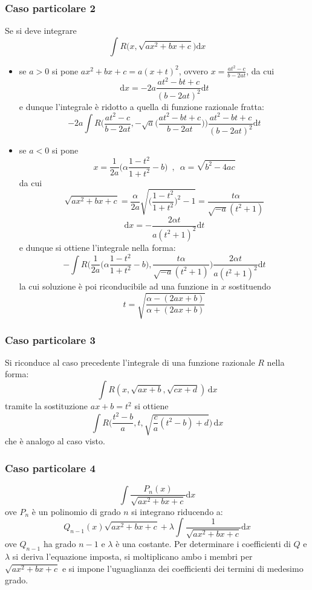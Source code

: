 \documentclass[10pt, oneside]{book}
\theoremstyle{plain}
\begin{document}
\subsubsection{Caso particolare 2}
Se si deve integrare
\[\int R\big(x, \sqrt{ax^2 +bx +c}\big)\textrm{d}x\]
\begin{itemize}
\item se $a > 0$ si pone $ax^2 + bx + c = a(x+t)^2$, ovvero $\displaystyle x = \frac{at^2 - c}{b - 2at}$, da cui
\[\textrm{d}x = - 2a \frac{at^2 - bt + c}{(b - 2at)^2	}\textrm{d}t\]
e dunque l'integrale è ridotto a quella di funzione razionale fratta:
\[-2a \int R \bigg(\frac{at^2 - c}{b - 2at}, - \sqrt{a}\big(\frac{at^2 - bt + c}{b-2at}\big)\bigg)\frac{at^2 - bt + c}{(b - 2at)^2	}\textrm{d}t\]
\item se $a < 0$ si pone
\[x = \frac{1}{2a} \big(\alpha \frac{1-t^2}{1+t^2} - b\big) \enspace, \enspace \alpha = \sqrt{b^2 - 4ac}\]
da cui
\[\sqrt{ax^2 + bx + c} = \frac{\alpha}{2a}\sqrt{\big(\frac{1-t^2}{1+t^2}\big)^2 - 1} = \frac{t\alpha}{\sqrt{-a}(t^2+1)}\]
\[\textrm{d}x = - \frac{2\alpha t}{a(t^2 + 1)^2}\textrm{d}t\]
e dunque si ottiene l'integrale nella forma:
\[- \int R \bigg(\frac{1}{2a} \big(\alpha \frac{1-t^2}{1+t^2} - b\big), \frac{t\alpha}{\sqrt{-a}(t^2+1)}\bigg)\frac{2\alpha t}{a(t^2+1)^2}\textrm{d}t\]
la cui soluzione è poi riconducibile ad una funzione in $x$ sostituendo
\[t = \sqrt{\frac{\alpha - (2ax + b)}{\alpha + (2ax + b)}}\]
\end{itemize}

\subsubsection{Caso particolare 3}
Si riconduce al caso precedente l'integrale di una funzione razionale $R$ nella forma:
\[\int R(x, \sqrt{ax+b}, \sqrt{cx + d}) \, \textrm{d}x\]
tramite la sostituzione $ax + b = t^2$ si ottiene
\[\int R \bigg(\frac{t^2 - b}{a}, t, \sqrt{\frac{c}{a}(t^2-b) + d}\bigg) \, \textrm{d}x\]
che è analogo al caso visto.

\subsubsection{Caso particolare 4}
\[\int\frac{P_n(x)}{\sqrt{ax^2 + bx + c}}\textrm{d}x\]
ove $P_n$ è un polinomio di grado $n$ si integrano riducendo a:
\[Q_{n-1}(x)\sqrt{ax^2 + bx + c} + \lambda \int\frac{1}{\sqrt{ax^2 + bx + c}}\textrm{d}x\]
ove $Q_{n-1}$ ha grado $n-1$ e $\lambda$ è una costante. Per determinare i coefficienti di $Q$ e $\lambda$ si deriva l'equazione imposta, si moltiplicano ambo i membri per $\sqrt{ax^2 + bx + c}$ e si impone l'uguaglianza dei coefficienti dei termini di medesimo grado.
\end{document}
